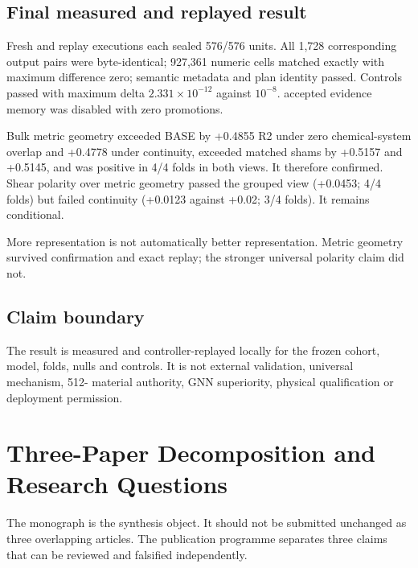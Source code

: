 \documentclass[11pt,a4paper,oneside]{report}
\begin{document}
\section{Final measured and replayed result}
Fresh and replay executions each sealed 576/576 units. All 1,728 corresponding output
pairs were byte-identical; 927,361 numeric cells matched exactly with maximum
difference zero; semantic metadata and plan identity passed. Controls passed with
maximum delta $2.331\times10^{-12}$ against $10^{-8}$. accepted evidence memory was disabled with zero
promotions.

Bulk metric geometry exceeded BASE by +0.4855 R2 under zero chemical-system overlap
and +0.4778 under continuity, exceeded matched shams by +0.5157 and +0.5145, and was
positive in 4/4 folds in both views. It therefore confirmed. Shear polarity over metric
geometry passed the grouped view (+0.0453; 4/4 folds) but failed continuity (+0.0123
against +0.02; 3/4 folds). It remains conditional.

\begin{governingrule}
More representation is not automatically better representation. Metric geometry
survived confirmation and exact replay; the stronger universal polarity claim did not.
\end{governingrule}

\section{Claim boundary}
The result is measured and controller-replayed locally for the frozen cohort, model,
folds, nulls and controls. It is not external validation, universal mechanism, 512-
material authority, GNN superiority, physical qualification or deployment permission.

\chapter{Three-Paper Decomposition and Research Questions}
\label{ch:publication-map}

The monograph is the synthesis object. It should not be submitted unchanged as
three overlapping articles. The publication programme separates three claims
that can be reviewed and falsified independently.
\end{document}
